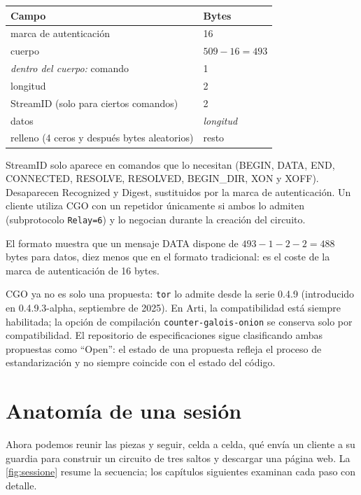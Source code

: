 \begin{center}
\begin{tabular}{ll}
\toprule
Campo & Bytes \\
\midrule
marca de autenticación & 16 \\
cuerpo & $509 - 16 = 493$ \\
\midrule
\quad \emph{dentro del cuerpo:} comando & 1 \\
\quad longitud & 2 \\
\quad StreamID (solo para ciertos comandos) & 2 \\
\quad datos & \emph{longitud} \\
\quad relleno (4 ceros y después bytes aleatorios) & resto \\
\bottomrule
\end{tabular}
\end{center}

StreamID solo aparece en comandos que lo necesitan (BEGIN, DATA, END, CONNECTED, RESOLVE, RESOLVED, BEGIN\_DIR, XON y XOFF). Desaparecen Recognized y Digest, sustituidos por la marca de autenticación. Un cliente utiliza CGO con un repetidor únicamente si ambos lo admiten (subprotocolo \texttt{Relay=6}) y lo negocian durante la creación del circuito.

\begin{approfondimento}
El formato muestra que un mensaje DATA dispone de $493 - 1 - 2 - 2 = 488$ bytes para datos, diez menos que en el formato tradicional: es el coste de la marca de autenticación de 16 bytes.
\end{approfondimento}

CGO ya no es solo una propuesta: \texttt{tor} lo admite desde la serie 0.4.9 (introducido en 0.4.9.3-alpha, septiembre de 2025). En Arti, la compatibilidad está siempre habilitada; la opción de compilación \texttt{counter-galois-onion} se conserva solo por compatibilidad. El repositorio de especificaciones sigue clasificando ambas propuestas como \enquote{Open}: el estado de una propuesta refleja el proceso de estandarización y no siempre coincide con el estado del código.

\section{Anatomía de una sesión}\label{sec:sessione}

Ahora podemos reunir las piezas y seguir, celda a celda, qué envía un cliente a su guardia para construir un circuito de tres saltos y descargar una página web. La \cref{fig:sessione} resume la secuencia; los capítulos siguientes examinan cada paso con detalle.

